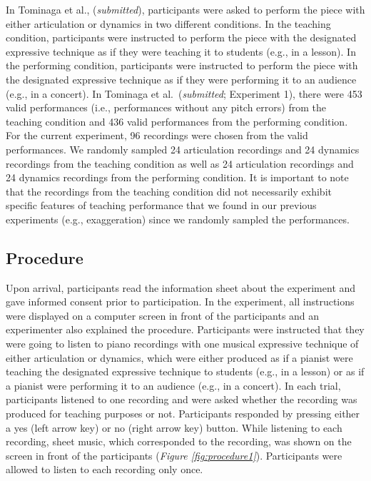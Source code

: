 \documentclass[
  man,floatsintext]{apa6}
\begin{document}
In Tominaga et al., (\emph{submitted}), participants were asked to perform the piece with either articulation or dynamics in two different conditions. In the teaching condition, participants were instructed to perform the piece with the designated expressive technique as if they were teaching it to students (e.g., in a lesson). In the performing condition, participants were instructed to perform the piece with the designated expressive technique as if they were performing it to an audience (e.g., in a concert). In Tominaga et al.~(\emph{submitted}; Experiment 1), there were 453 valid performances (i.e., performances without any pitch errors) from the teaching condition and 436 valid performances from the performing condition. For the current experiment, 96 recordings were chosen from the valid performances. We randomly sampled 24 articulation recordings and 24 dynamics recordings from the teaching condition as well as 24 articulation recordings and 24 dynamics recordings from the performing condition. It is important to note that the recordings from the teaching condition did not necessarily exhibit specific features of teaching performance that we found in our previous experiments (e.g., exaggeration) since we randomly sampled the performances.

\hypertarget{procedure}{%
\subsection{Procedure}\label{procedure}}

Upon arrival, participants read the information sheet about the experiment and gave informed consent prior to participation. In the experiment, all instructions were displayed on a computer screen in front of the participants and an experimenter also explained the procedure. Participants were instructed that they were going to listen to piano recordings with one musical expressive technique of either articulation or dynamics, which were either produced as if a pianist were teaching the designated expressive technique to students (e.g., in a lesson) or as if a pianist were performing it to an audience (e.g., in a concert). In each trial, participants listened to one recording and were asked whether the recording was produced for teaching purposes or not. Participants responded by pressing either a yes (left arrow key) or no (right arrow key) button. While listening to each recording, sheet music, which corresponded to the recording, was shown on the screen in front of the participants (\emph{Figure \ref{fig:procedure1}}). Participants were allowed to listen to each recording only once.
\end{document}
